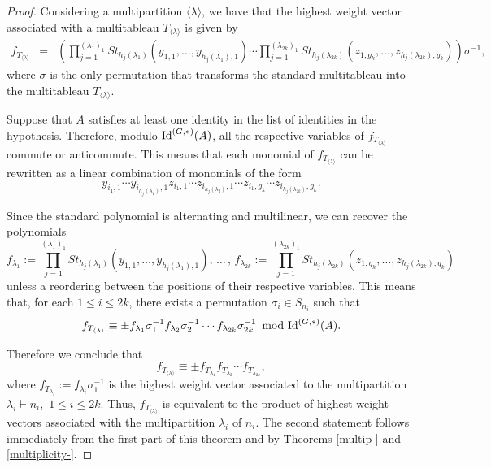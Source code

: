 \documentclass{amsart}
\newcommand{\IdG}{\ensuremath{\textnormal{Id}^{(G,\ast)}}}
\numberwithin{equation}{section}
\begin{document}
\begin{proof}
Considering a multipartition $\langle \lambda \rangle$, we have that the highest weight vector associated with a multitableau $T_{\langle \lambda \rangle}$ is given by 
	$$\begin{array}{cclc}	
	f_{T_{\langle \lambda \rangle}} &=&\left(\prod\limits_{j=1}^{(\lambda_1)_1}St_{{h_j}(\lambda_1)}(y_{1,1}, \ldots, y_{{h_j}(\lambda_1),1})  \cdots \prod\limits_{j=1}^{(\lambda_{2k})_1}St_{{h_j}(\lambda_{2k})}(z_{1,g_k}, \ldots, z_{{h_j}(\lambda_{2k}),g_k})\right)\sigma^{-1},
\end{array}$$
where $\sigma$ is the only permutation that transforms the standard multitableau into the multitableau $T_{\langle \lambda \rangle}.$

	Suppose that $A$ satisfies at least one identity in the list of identities in the hypothesis. Therefore, modulo $\IdG(A)$, all the respective variables of $f_{T_{\langle \lambda \rangle}}$ commute or anticommute. This means that each monomial of $f_{T_{\langle \lambda \rangle}}$ can be rewritten as a linear combination of monomials of the form
    $$ y_{i_1,1}\cdots y_{i_{h_j(\lambda_1)},1} z_{i_1,1}\cdots z_{i_{h_j(\lambda_2)},1}\cdots z_{i_1,g_k}\cdots z_{i_{h_j(\lambda_{2k})},g_k}.$$
    
    Since the standard polynomial is alternating and multilinear, we can recover the polynomials 
$$f_{\lambda_1}:=\prod\limits_{j=1}^{(\lambda_1)_1}St_{h_j(\lambda_1)}(y_{1,1},\ldots,y_{h_j(\lambda_1),1}),\, \ldots  \,,\, f_{\lambda_{2k}}:=\prod\limits_{j=1}^{(\lambda_{2k})_1}St_{h_j(\lambda_{2k})}(z_{1,g_k},\ldots,z_{h_j(\lambda_{2k}),g_k})$$  
     unless a reordering between the positions of their respective variables. This means that, for each $1\leq i\leq 2k$, there exists a permutation $\sigma_i\in S_{n_i}$ such that
      $$f_{T_{\langle \lambda \rangle}}\equiv \pm f_{\lambda_1}\sigma_1^{-1} f_{\lambda_2}\sigma_2^{-1}\cdots  f_{\lambda_{2k}}\sigma_{2k}^{-1} \,\mbox{ mod }\IdG(A).$$

Therefore we conclude that 
$$		f_{T_{\langle \lambda \rangle}} \equiv  \pm f_{T_{\lambda_1}}	f_{T_{\lambda_2}}\cdots f_{T_{\lambda_{2k}}},
$$ where $f_{T_{\lambda_i}}:=f_{\lambda_i}\sigma_1^{-1}$
is the highest weight vector  associated to the multipartition
$\lambda_i\vdash n_i,$ $1\leq i\leq 2k$. Thus, $f_{{T}_{\langle \lambda \rangle}}$ is equivalent to the product of highest weight vectors  associated with the multipartition $\lambda_{i}$ of $n_i.$ The second statement follows immediately from the first part of this theorem and by Theorems \ref{multip-} and \ref{multiplicity-}. 	
\end{proof}
\end{document}
